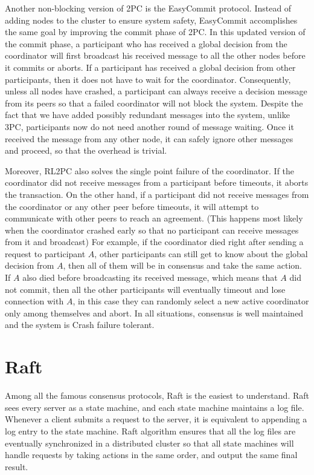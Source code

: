 \documentclass[11pt]{article}
\begin{document}
    Another non-blocking version of \small{2PC} \normalsize is the EasyCommit protocol\autocite{i2pc2}. Instead of adding nodes to the cluster to ensure system safety, EasyCommit accomplishes the same goal by improving the commit phase of \small{2PC}\normalsize. In this updated version of the commit phase, a participant who has received a global decision from the coordinator will first broadcast his received message to all the other nodes before it commits or aborts. If a participant has received a global decision from other participants, then it does not have to wait for the coordinator. Consequently, unless all nodes have crashed, a participant can always receive a decision message from its peers so that a failed coordinator will not block the system. Despite the fact that we have added possibly redundant messages into the system, unlike \small{3PC}\normalsize, participants now do not need another round of message waiting. Once it received the message from any other node, it can safely ignore other messages and proceed, so that the overhead is trivial.

    Moreover, \small{RL2PC} \normalsize also solves the single point failure of the coordinator. If the coordinator did not receive messages from a participant before timeouts, it aborts the transaction. On the other hand, if a participant did not receive messages from the coordinator or any other peer before timeouts, it will attempt to communicate with other peers to reach an agreement. (This happens most likely when the coordinator crashed early so that no participant can receive messages from it and broadcast) For example, if the coordinator died right after sending a request to participant $A$, other participants can still get to know about the global decision from $A$, then all of them will be in consensus and take the same action. If $A$ also died before broadcasting its received message, which means that $A$ did not commit, then all the other participants will eventually timeout and lose connection with $A$, in this case they can randomly select a new active coordinator only among themselves and abort. In all situations, consensus is well maintained and the system is Crash failure tolerant.

  \section{Raft}
    Among all the famous consensus protocols, Raft\autocite{raft} is the easiest to understand. Raft sees every server as a state machine, and each state machine maintains a log file. Whenever a client submits a request to the server, it is equivalent to appending a log entry to the state machine. Raft algorithm ensures that all the log files are eventually synchronized in a distributed cluster so that all state machines will handle requests by taking actions in the same order, and output the same final result.
\end{document}
